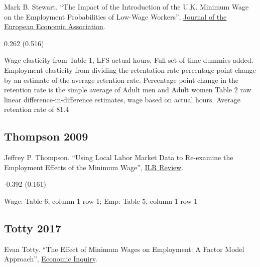 \noindent Mark B. Stewart. ``The Impact of the Introduction of the U.K. Minimum Wage on the Employment Probabilities of Low-Wage Workers'', \href{https://doi.org/10.1162/154247604323015481}{Journal of the European Economic Association}.

\vspace{0.7em}

 0.262 (0.516)

\vspace{0.7em}

 Wage elasticity from Table 1, LFS actual hours, Full set of time dummies added. Employment elasticity from dividing the retentation rate percentage point change by an estimate of the average retention rate. Percentage point change in the retention rate is the simple average of Adult men and Adult women Table 2 raw linear difference-in-difference estimates, wage based on actual hours. Average retention rate of 81.4%

\subsection*{Thompson 2009}
\vspace{-0.7em}

\noindent Jeffrey P. Thompson. ``Using Local Labor Market Data to Re-examine the Employment Effects of the Minimum Wage'', \href{https://doi.org/10.1177/001979390906200305}{ILR Review}.

\vspace{0.7em}

 -0.392 (0.161)

\vspace{0.7em}

 Wage: Table 6, column 1 row 1; Emp: Table 5, column 1 row 1

\subsection*{Totty 2017}
\vspace{-0.7em}

\noindent Evan Totty. ``The Effect of Minimum Wages on Employment: A Factor Model Approach'', \href{https://doi.org/10.1111/ecin.12472}{Economic Inquiry}.

